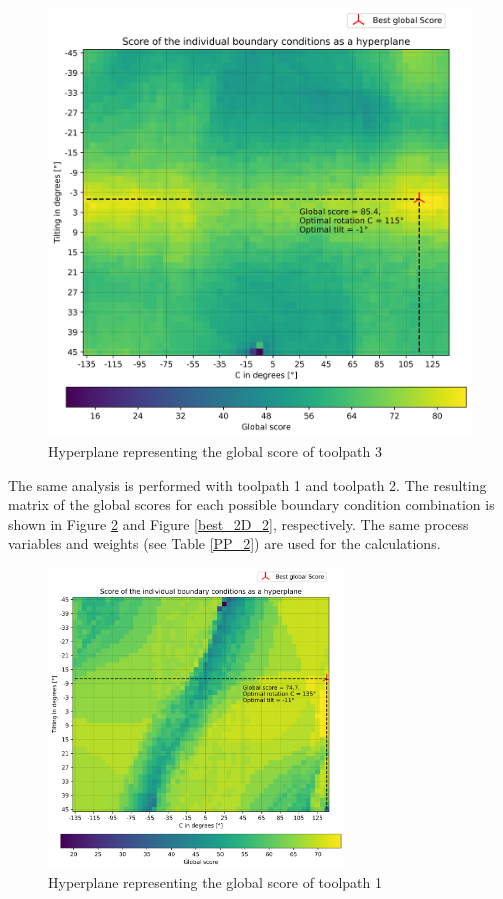 \begin{figure}[H]
	\centerline{\includegraphics[width=1\textwidth]{figures/best_2D_3.png}}
	\caption{Hyperplane representing the global score of toolpath 3}
	\label{best_2D}
\end{figure}

The same analysis is performed with toolpath 1 and toolpath 2. The resulting matrix of the global scores for each possible boundary condition combination is shown in Figure \ref{best_2D_1} and Figure \ref{best_2D_2}, respectively. The same process variables and weights (see Table \ref{PP_2}) are used for the calculations.


\begin{figure}[H]
	\centerline{\includegraphics[width=0.7\textwidth]{figures/best_2D_1.png}}
	\caption{Hyperplane representing the global score of toolpath 1}
	\label{best_2D_1}
\end{figure}

